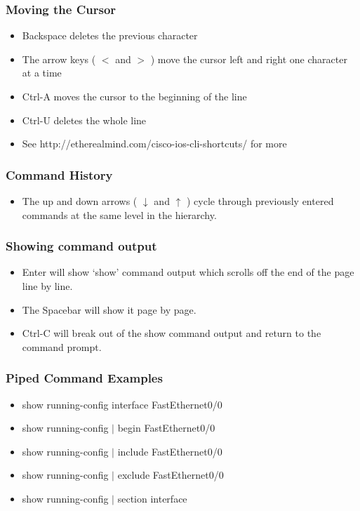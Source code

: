 \documentclass[pdflatex,compress]{beamer}
\begin{document}
\begin{frame}
	\frametitle{Moving the Cursor}
	\begin{itemize}
		\item Backspace deletes the previous character
		\item The arrow keys ( $ < $ and $ > $ ) move the cursor left and right one character at a time
		\item Ctrl-A moves the cursor to the beginning of the line
		\item Ctrl-U deletes the whole line
		\item See http://etherealmind.com/cisco-ios-cli-shortcuts/ for more
	\end{itemize}
\end{frame}

\begin{frame}
	\frametitle{Command History}
	\begin{itemize}
		\item The up and down arrows ( $\downarrow$ and $\uparrow$ ) cycle through previously entered commands at the same level in the hierarchy.
	\end{itemize}
\end{frame}

\begin{frame}
	\frametitle{Showing command output}
	\begin{itemize}
		\item Enter will show ‘show’ command output which scrolls off the end of the page line by line.
		\item The Spacebar will show it page by page.
		\item Ctrl-C will break out of the show command output and return to the command prompt.
	\end{itemize}
\end{frame}

\begin{frame}
	\frametitle{Piped Command Examples}
	\begin{itemize}
		\item show running-config interface FastEthernet0/0
		\item show running-config $ | $ begin FastEthernet0/0
		\item show running-config $ | $ include FastEthernet0/0
		\item show running-config $ | $ exclude FastEthernet0/0
		\item show running-config $ | $ section interface
	\end{itemize}
\end{frame}
\end{document}
